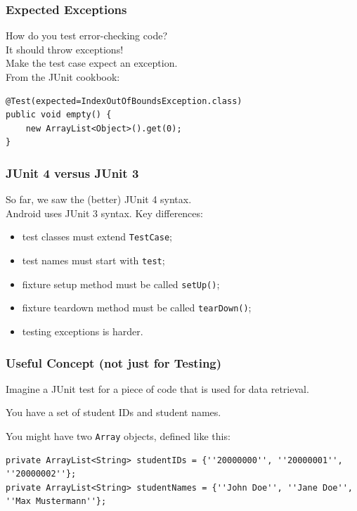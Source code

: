 \begin{frame}[fragile]
\frametitle{Expected Exceptions}

\begin{changemargin}{1cm}
How do you test error-checking code?\\[1em]

\pause
It should throw exceptions!\\[1em]

Make the test case expect an exception.\\[1em]
From the JUnit cookbook:
\end{changemargin}

\begin{verbatim}
@Test(expected=IndexOutOfBoundsException.class) 
public void empty() { 
    new ArrayList<Object>().get(0); 
}
\end{verbatim}

\end{frame}

\begin{frame}
\frametitle{JUnit 4 versus JUnit 3}

\begin{changemargin}{1.5cm}
So far, we saw the (better) JUnit 4 syntax.\\[1em]

Android uses JUnit 3 syntax. Key differences:

\begin{itemize}
\item test classes must extend {\tt TestCase};
\item test names must start with {\tt test};
\item fixture setup method must be called {\tt setUp()};
\item fixture teardown method must be called {\tt tearDown()};
\item testing exceptions is harder.
\end{itemize}

\end{changemargin}
\end{frame}


\begin{frame}[fragile]
\frametitle{Useful Concept (not just for Testing)}

\begin{changemargin}{1.5cm}

Imagine a JUnit test for a piece of code that is used for data retrieval. 

You have a set of student IDs and student names. 

You might have two \texttt{Array} objects, defined like this:

{\tiny
\begin{verbatim}
private ArrayList<String> studentIDs = {''20000000'', ''20000001'', ''20000002''};
private ArrayList<String> studentNames = {''John Doe'', ''Jane Doe'', ''Max Mustermann''};
\end{verbatim}
}


\end{changemargin}
\end{frame}

